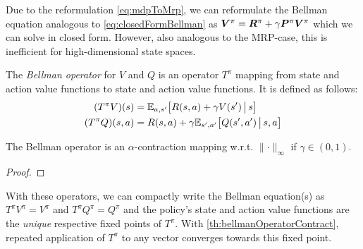 				Due to the reformulation \eqref{eq:mdpToMrp}, we can reformulate the Bellman equation analogous to \eqref{eq:closedFormBellman} as \( \bm{V}^\pi = \bm{R}^\pi + \gamma \bm{P}^\pi \bm{V}^\pi \) which we can solve in closed form. However, also analogous to the \ac{MRP}-case, this is inefficient for high-dimensional state spaces.

				\begin{definition}  \label{def:bellmanOperator}
					The \emph{Bellman operator} for \(V\) and \(Q\) is an operator \(T^\pi\) mapping from state and action value functions to state and action value functions. It is defined as follows:
					\begin{align}
						(T^\pi V)(s)    & = \mathbb{E}_{a, s'}\bigl[ R(s, a) + \gamma V(s') \,\big\vert\, s \bigr]          \\
						(T^\pi Q)(s, a) & = R(s, a) + \gamma \mathbb{E}_{s', a'} \bigl[ Q(s', a') \,\big\vert\, s, a \bigr]
					\end{align}
				\end{definition}
				\begin{theorem}  \label{th:bellmanOperatorContract}
					The Bellman operator is an \(\alpha\)-contraction mapping w.r.t. \( \lVert \cdot \rVert_\infty \) if \( \gamma \in (0, 1) \).
				\end{theorem}
				\begin{proof}
				\end{proof}
				\begin{remark}
					With these operators, we can compactly write the Bellman equation(s) as \( T^\pi V^\pi = V^\pi \) and \( T^\pi Q^\pi = Q^\pi \) and the policy's state and action value functions are the \emph{unique} respective fixed points of \(T^\pi\). With \autoref{th:bellmanOperatorContract}, repeated application of \(T^\pi\) to any vector converges towards this fixed point.
				\end{remark}

